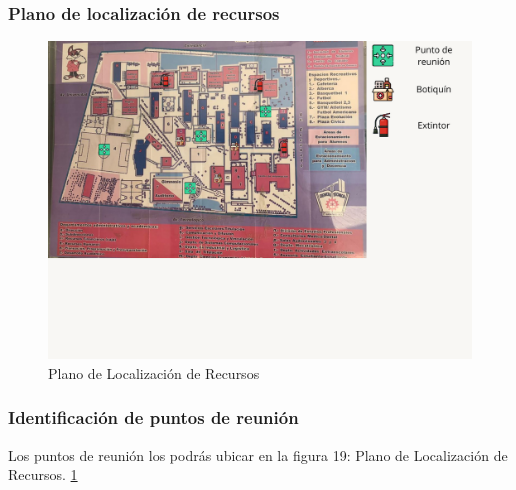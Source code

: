 \subsubsection{Plano de localización de recursos}
%
%
\begin{figure}[H]
        \centering
        \includegraphics[trim = {15mm 55mm 10mm 3mm},clip,scale=0.40]{16/Img/planoDeRecursos.pdf}
        \caption{Plano de Localización de Recursos}
        \label{Plano de Localización de Recursos}
    \end{figure}
%
%
\subsubsection{Identificación de puntos de reunión}
Los puntos de reunión los podrás ubicar en la figura 19: Plano de Localización de Recursos. \ref{Plano de Localización de Recursos}
